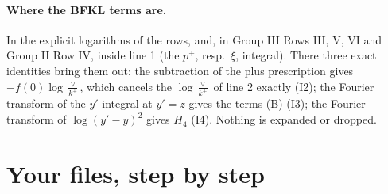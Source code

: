 \documentclass[10pt]{article}
\numberwithin{equation}{section}
\begin{document}
\paragraph{Where the BFKL terms are.} In the explicit logarithms of the rows, and, in Group III Rows III, V, VI and Group II Row IV, inside line 1 (the $p^+$, resp.\ $\xi$, integral). There three exact identities bring them out: the subtraction of the plus prescription gives $-f(0)\log\frac{\vee}{k^+}$, which cancels the $\log\frac{\vee}{k^+}$ of line 2 exactly (I2); the Fourier transform of the $y'$ integral at $y'=z$ gives the terms (B) (I3); the Fourier transform of $\log(y'-y)^2$ gives $H_4$ (I4). Nothing is expanded or dropped.

\section{Your files, step by step}\label{sec:files}
\end{document}
